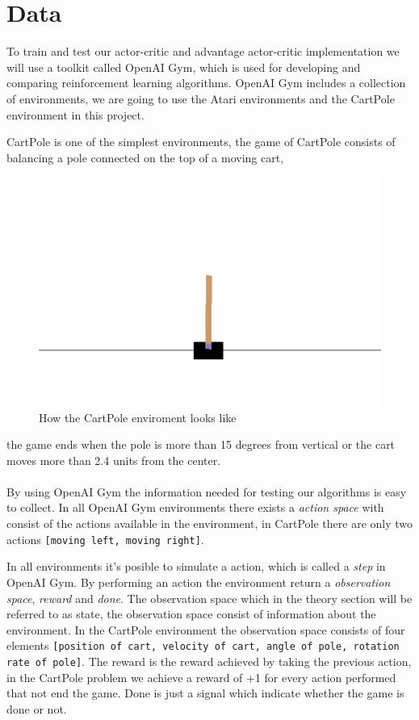 \documentclass[11pt]{article}
\begin{document}
\maketitle

\section{Data}

To train and test our actor-critic and advantage actor-critic implementation we will use a toolkit called OpenAI Gym, which is used for developing and comparing reinforcement learning algorithms\cite{openAIGym}. OpenAI Gym includes a collection of environments, we are going to use the Atari environments and the CartPole environment in this project.

CartPole is one of the simplest environments, the game of CartPole consists of balancing a pole connected on the top of a moving cart,
\begin{figure}[!h]
    \centering
    \includegraphics[scale=0.5]{include/cartpole.png}
    \caption{How the CartPole enviroment looks like}
    \label{fig:layers}
\end{figure}
the game ends when the pole is more than 15 degrees from vertical or the cart moves more than 2.4 units from the center.
\\ \\
By using OpenAI Gym the information needed for testing our algorithms is easy to collect. In all OpenAI Gym environments there exists a \textit{action space} with consist of the actions available in the environment, in CartPole there are only two actions \texttt{[moving left, moving right]}. 

In all environments it's posible to simulate a action, which is called a \textit{step} in OpenAI Gym. By performing an action the environment return a \textit{observation space}, \textit{reward} and \textit{done}. The observation space which in the theory section will be referred to as state, the observation space consist of information about the environment. In the CartPole environment the observation space consists of four elements \texttt{[position of cart, velocity of cart, angle of pole, rotation rate of pole]}. The reward is the reward achieved by taking the previous action, in the CartPole problem we achieve a reward of +1 for every action performed that not end the game. Done is just a signal which indicate whether the game is done or not.
\end{document}
